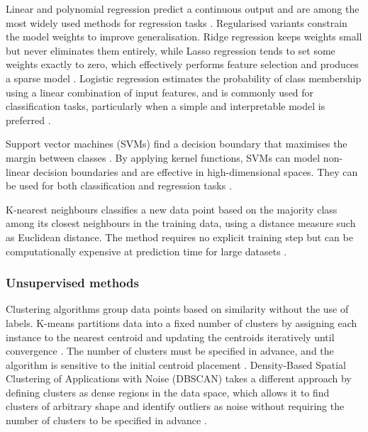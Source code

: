 Linear and polynomial regression predict a continuous output and 
are among the most widely used methods for regression tasks 
\parencite{sarker2021machine_learning_algorithms_real_world_applications_research_directions}. 
Regularised variants constrain the model weights to improve 
generalisation. Ridge regression keeps weights small but never 
eliminates them entirely, while Lasso regression tends to set some 
weights exactly to zero, which effectively performs feature 
selection and produces a sparse model 
\parencite{tibshirani1996regression_lasso_ridge, 
geron2019hands_on_machine_learning}. 
Logistic regression estimates the probability of class membership 
using a linear combination of input features, and is commonly used 
for classification tasks, particularly when a simple and 
interpretable model is preferred 
\parencites[Chapter~4]{geron2019hands_on_machine_learning}{sarker2021machine_learning_algorithms_real_world_applications_research_directions}.

Support vector machines (SVMs) find a decision boundary that maximises
the margin between classes 
\parencite{cortes1995support_vector_networks}. 
By applying kernel functions, SVMs can model non-linear decision 
boundaries and are effective in high-dimensional spaces. They can 
be used for both classification and regression tasks 
\parencites[Chapter~5]{geron2019hands_on_machine_learning}{sarker2021machine_learning_algorithms_real_world_applications_research_directions}.

K-nearest neighbours classifies a new data point based on the 
majority class among its closest neighbours in the training data, 
using a distance measure such as Euclidean distance. The method 
requires no explicit training step but can be computationally 
expensive at prediction time for large datasets 
\parencite{cunningham2021k_nearest_neighbour_classifiers_tutorial,
sarker2021machine_learning_algorithms_real_world_applications_research_directions}.

\subsubsection*{Unsupervised methods}

Clustering algorithms group data points based on similarity without 
the use of labels. K-means partitions data into a fixed number of 
clusters by assigning each instance to the nearest centroid and 
updating the centroids iteratively until convergence 
\parencite[Chapter~9]{geron2019hands_on_machine_learning}. 
The number of clusters must be specified in advance, and the 
algorithm is sensitive to the initial centroid placement 
\parencite[Chapter~9]{geron2019hands_on_machine_learning}. 
Density-Based Spatial Clustering of Applications with Noise (DBSCAN) takes a different approach by defining clusters as dense
regions in the data space, which allows it to find clusters of 
arbitrary shape and identify outliers as noise without requiring 
the number of clusters to be specified in advance 
\parencite{ester1996dbscan,
sarker2021machine_learning_algorithms_real_world_applications_research_directions}.

